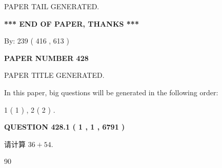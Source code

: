 \documentclass{ctexart}
\begin{document}
   
   
   
   
   
 \vspace{0.2in}
 
   
   
\vspace{2.0in} PAPER TAIL GENERATED.
   
   
   
   
\vspace{1.0in} 
{\textbf{\large{ *** END OF PAPER, THANKS *** }}} 
   
   
\hspace{1.0in} By: 
 239 ( 416 ,  613 )
   
   
   
   
\newpage 
\setcounter{page}{ 
   428001 } 
   
   
   
   
 {\textbf{ \Large{ PAPER NUMBER  428  }}}
   
   
\vspace{0.2in}
   
   
   
   
   
   
   
   
 \vspace{0.2in}
 
 
 
 
   
   
 PAPER TITLE GENERATED.
   
   
   
\vspace{0.2in}
   
In this paper, big questions will be generated in the following order: 
   
   
   1 ( 1 )
 ,
   2 ( 2 )
 .
  
\vspace{0.2in}
  
{\textbf{\Large{QUESTION
428.1 
 ( 1 , 1 , 6791 )
}}}
  
  
 
请计算 $ %
36 +  %
54 $.
 
 
 
\noindent{}
 
 

90
 
 
\noindent{}
 
\end{document}

